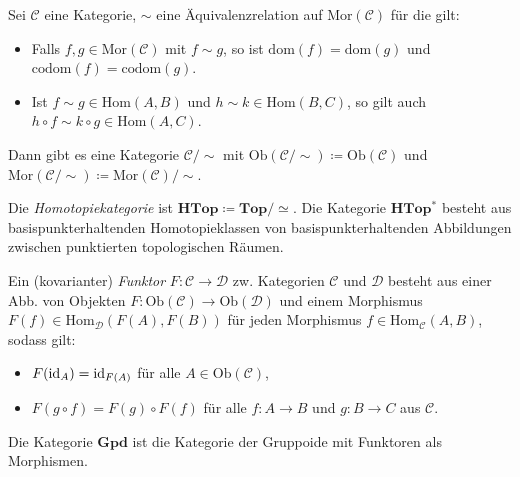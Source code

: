 \documentclass{cheat-sheet}
\newcommand{\Ob}{\mathrm{Ob}} %
\newcommand{\Hom}{\mathrm{Hom}} %
\newcommand{\Mor}{\mathrm{Mor}} %
\newcommand{\dom}{\mathrm{dom}} %
\newcommand{\codom}{\mathrm{codom}} %
\begin{document}
\begin{bem}
  Sei $\mathcal{C}$ eine Kategorie, ${\sim}$ eine Äquivalenzrelation auf $\Mor(\mathcal{C})$ für die gilt:
  \begin{itemize}
    \item Falls $f, g \in \Mor(\mathcal{C})$ mit $f \sim g$, so ist $\dom(f) = \dom(g)$ und $\codom(f) = \codom(g)$.
    \item Ist $f \sim g \in \Hom(A, B)$ und $h \sim k \in \Hom(B, C)$, so gilt auch $h \circ f \sim k \circ g \in \Hom(A, C)$.
  \end{itemize}
  Dann gibt es eine Kategorie $\mathcal{C}/{\sim}$ mit $\Ob(\mathcal{C}/{\sim}) \coloneqq \Ob(\mathcal{C})$ und $\Mor(\mathcal{C}/{\sim}) \coloneqq \Mor(\mathcal{C})/{\sim}$.
\end{bem}

\begin{defn}
  Die \emph{Homotopiekategorie} ist $\mathbf{HTop} \coloneqq \mathbf{Top} / {\simeq}$.
  Die Kategorie $\mathbf{HTop^*}$ besteht aus basispunkterhaltenden Homotopieklassen von basispunkterhaltenden Abbildungen zwischen punktierten topologischen Räumen.
\end{defn}


\begin{defn}
  Ein (kovarianter) \emph{Funktor} $F : \mathcal{C} \to \mathcal{D}$ zw. Kategorien $\mathcal{C}$ und $\mathcal{D}$ besteht aus einer Abb. von Objekten $F : \Ob(\mathcal{C}) \to \Ob(\mathcal{D})$ und einem Morphismus $F(f) \in \Hom_{\mathcal{D}}(F(A), F(B))$ für jeden Morphismus $f \in \Hom_{\mathcal{C}}(A, B)$, sodass gilt:
  \begin{itemize}
    \item $F(\mathrm{id}_A) = \mathrm{id}_{F(A)}$ für alle $A \in \Ob(\mathcal{C})$,
    \item $F(g \circ f) = F(g) \circ F(f)$ für alle $f : A \to B$ und $g : B \to C$ aus $\mathcal{C}$.
  \end{itemize}
\end{defn}

\begin{defn}
  Die Kategorie $\mathbf{Gpd}$ ist die Kategorie der Gruppoide mit Funktoren als Morphismen.
\end{defn}
\end{document}
